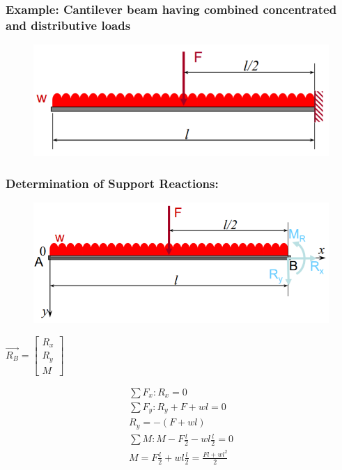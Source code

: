 \documentclass[class=report, crop=false, 12pt,a4paper]{standalone}
\begin{document}
\subsubsection{Example: Cantilever beam having combined concentrated and distributive loads}
\begin{figure}[H]
  \centering
  \includegraphics[width = 0.7 \textwidth]{../img/cantileverbeam.PNG}
\end{figure}
\subsubsection{Determination of Support Reactions:}
\begin{figure}[H]
  \centering
  \includegraphics[width = 0.75 \textwidth]{../img/supportreactions.PNG}
\end{figure}
\begin{center}
  $\vec{R_B} = \left[ \begin{array}{ccc} R_x \\ R_y \\ M \end{array}\right]$
\end{center}
\begin{gather*}
  \sum F_x: R_x = 0 \\
  \sum F_y: R_y + F + wl = 0 \\
  R_y = -(F+wl) \\
  \sum M: M - F\frac{l}{2} - wl\frac{l}{2} = 0 \\
  M = F\frac{l}{2} + wl\frac{l}{2} = \frac{Fl+wl^2}{2}
\end{gather*}
\end{document}
